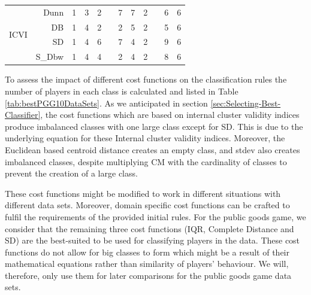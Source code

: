 \begin{table}[!h]
\begin{tabular}{@{}crcccccccccc@{}}
        \multirow{4}{*}{\begin{turn}{90}{\scriptsize ICVI }\end{turn}}
        & Dunn & 
          1  & 3  & 2 & \phantom{abc}           
        & 7  & 7  & 2 & \phantom{abc}        
        & 6  & 6    \\
        
        &DB & 
          1  & 4  & 2 & \phantom{abc}           
          & 2  & 5  & 2 & \phantom{abc}        
          & 5  & 6    \\
        
        & SD & 
          1  & 4  & 6 & \phantom{abc}           
          & 7  & 4  & 2 & \phantom{abc}        
          & 9  & 6    \\
        
        &S\_Dbw & 
          1  & 4  & 4 & \phantom{abc}           
          & 2  & 4  & 2 & \phantom{abc}        
          & 8  & 6    \\
        
        \bottomrule                        
    \end{tabular}
\end{table}

To assess the impact of different cost functions on the classification rules the number of players in each class is calculated and listed in Table \ref{tab:bestPGG10DataSets}. As we anticipated in section \ref{sec:Selecting-Best-Classifier}, the cost functions which are based on internal cluster validity indices produce imbalanced classes with one large class except for SD. This is due to the underlying equation for these Internal cluster validity indices. Moreover, the Euclidean based centroid distance creates an empty class, and stdev also creates imbalanced classes, despite multiplying CM with the cardinality of classes to prevent the creation of a large class. 

These cost functions might be modified to work in different situations with different data sets. Moreover, domain specific cost functions can be crafted to fulfil the requirements of the provided initial rules. For the public goods game, we consider that the remaining three cost functions (IQR, Complete Distance and SD) are the best-suited to be used for classifying players in the data. These cost functions do not allow for big classes to form which might be a result of their mathematical equations rather than similarity of players' behaviour. We will, therefore, only use them for later comparisons for the public goods game data sets.

